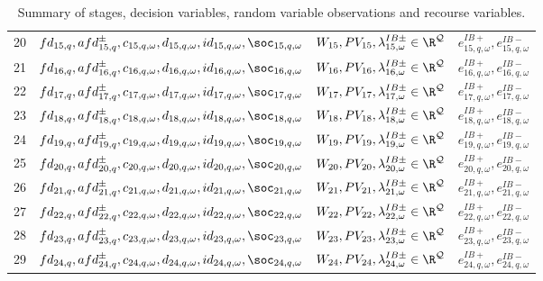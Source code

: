\begin{table}[H]
\begin{tabular}{c c c c}
	20& $fd_{15,q}, afd^{\pm}_{15,q}, c_{15,q, \omega}, d_{15,q, \omega}, id_{15,q, \omega}, \soc_{15,q, \omega}$ & $W_{15}, PV_{15}, \lambda^{IB\pm}_{15, \omega} \in \R^\mathcal{Q}$ & $e^{IB+}_{15,q, \omega}, e^{IB-}_{15,q, \omega}$\\
	21& $fd_{16,q}, afd^{\pm}_{16,q}, c_{16,q, \omega}, d_{16,q, \omega}, id_{16,q, \omega}, \soc_{16,q, \omega}$ & $W_{16}, PV_{16}, \lambda^{IB\pm}_{16, \omega} \in \R^\mathcal{Q}$ & $e^{IB+}_{16,q, \omega}, e^{IB-}_{16,q, \omega}$\\
	22& $fd_{17,q}, afd^{\pm}_{17,q}, c_{17,q, \omega}, d_{17,q, \omega}, id_{17,q, \omega}, \soc_{17,q, \omega}$ & $W_{17}, PV_{17}, \lambda^{IB\pm}_{17, \omega} \in \R^\mathcal{Q}$ & $e^{IB+}_{17,q, \omega}, e^{IB-}_{17,q, \omega}$\\
	23& $fd_{18,q}, afd^{\pm}_{18,q}, c_{18,q, \omega}, d_{18,q, \omega}, id_{18,q, \omega}, \soc_{18,q, \omega}$ & $W_{18}, PV_{18}, \lambda^{IB\pm}_{18, \omega} \in \R^\mathcal{Q}$ &  $e^{IB+}_{18,q, \omega}, e^{IB-}_{18,q, \omega}$\\
	24& $fd_{19,q}, afd^{\pm}_{19,q}, c_{19,q, \omega}, d_{19,q, \omega}, id_{19,q, \omega}, \soc_{19,q, \omega}$ & $W_{19}, PV_{19}, \lambda^{IB\pm}_{19, \omega} \in \R^\mathcal{Q}$ & $e^{IB+}_{19,q, \omega}, e^{IB-}_{19,q, \omega}$\\
	25& $fd_{20,q}, afd^{\pm}_{20,q}, c_{20,q, \omega}, d_{20,q, \omega}, id_{20,q, \omega}, \soc_{20,q, \omega}$  & $W_{20}, PV_{20}, \lambda^{IB\pm}_{20, \omega} \in \R^\mathcal{Q}$ & $e^{IB+}_{20,q, \omega}, e^{IB-}_{20,q, \omega}$\\
	26&  $fd_{21,q}, afd^{\pm}_{21,q}, c_{21,q, \omega}, d_{21,q, \omega}, id_{21,q, \omega}, \soc_{21,q, \omega}$ & $W_{21}, PV_{21}, \lambda^{IB\pm}_{21, \omega} \in \R^\mathcal{Q}$ & $e^{IB+}_{21,q, \omega}, e^{IB-}_{21,q, \omega}$\\
	27& $fd_{22,q}, afd^{\pm}_{22,q}, c_{22,q, \omega}, d_{22,q, \omega}, id_{22,q, \omega}, \soc_{22,q, \omega}$ & $W_{22}, PV_{22}, \lambda^{IB\pm}_{22, \omega} \in \R^\mathcal{Q}$ & $e^{IB+}_{22,q, \omega}, e^{IB-}_{22,q, \omega}$\\
	28& $fd_{23,q}, afd^{\pm}_{23,q}, c_{23,q, \omega}, d_{23,q, \omega}, id_{23,q, \omega}, \soc_{23,q, \omega}$ & $W_{23}, PV_{23}, \lambda^{IB\pm}_{23, \omega} \in \R^\mathcal{Q}$ & $e^{IB+}_{23,q, \omega}, e^{IB-}_{23,q, \omega}$\\
	29& $fd_{24,q}, afd^{\pm}_{24,q}, c_{24,q, \omega}, d_{24,q, \omega}, id_{24,q, \omega}, \soc_{24,q, \omega}$ & $W_{24}, PV_{24}, \lambda^{IB\pm}_{24, \omega} \in \R^\mathcal{Q}$ & $e^{IB+}_{24,q, \omega}, e^{IB-}_{24,q, \omega}$\\
\end{tabular}
\caption{Summary of stages, decision variables, random variable observations and recourse variables.}
\label{TABLE:stages-rv-dv-subperiods}
\end{table}